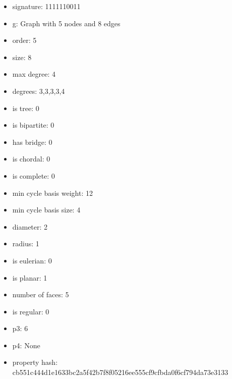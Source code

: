 \begin{itemize}
\item signature: 1111110011
\item g: Graph with 5 nodes and 8 edges
\item order: 5
\item size: 8
\item max degree: 4
\item degrees: 3,3,3,3,4
\item is tree: 0
\item is bipartite: 0
\item has bridge: 0
\item is chordal: 0
\item is complete: 0
\item min cycle basis weight: 12
\item min cycle basis size: 4
\item diameter: 2
\item radius: 1
\item is eulerian: 0
\item is planar: 1
\item number of faces: 5
\item is regular: 0
\item p3: 6
\item p4: None
\item property hash: cb551c444d1e1633bc2a5f42b7f8f05216ee555cf9cfbda0f6cf794da73e3133
\end{itemize}
\newpage
